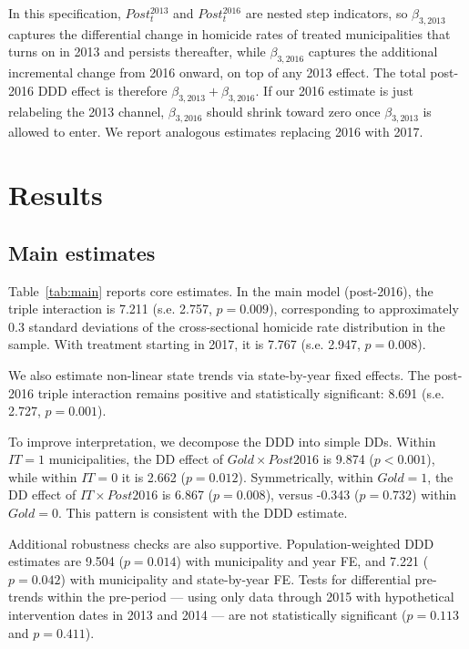 \documentclass[preprint,12pt]{elsarticle}
\renewcommand{\arraystretch}{1.2}
\begin{document}
In this specification, \(Post^{2013}_t\) and \(Post^{2016}_t\) are nested step indicators, so \(\beta_{3,2013}\) captures the differential change in homicide rates of treated municipalities that turns on in 2013 and persists thereafter, while \(\beta_{3,2016}\) captures the additional incremental change from 2016 onward, on top of any 2013 effect. The total post-2016 DDD effect is therefore \(\beta_{3,2013}+\beta_{3,2016}\). If our 2016 estimate is just relabeling the 2013 channel, $\beta_{3,2016}$ should shrink toward zero once $\beta_{3,2013}$ is allowed to enter. We report analogous estimates replacing 2016 with 2017.

\section{Results}
\subsection{Main estimates}
Table~\ref{tab:main} reports core estimates. In the main model (post-2016), the triple interaction is 7.211 (s.e. 2.757, \(p=0.009\)), corresponding to approximately 0.3 standard deviations of the cross-sectional homicide rate distribution in the sample. With treatment starting in 2017, it is 7.767 (s.e. 2.947, \(p=0.008\)).

We also estimate non-linear state trends via state-by-year fixed effects. The post-2016 triple interaction remains positive and statistically significant: 8.691 (s.e. 2.727, \(p=0.001\)).

\begin{table}[H]
\caption{Main DDD Estimates in Amazônia $+$ Cerrado Municipalities (2010$-$2022)}
\label{tab:main}
\centering
\setlength{\tabcolsep}{3.5pt}
\renewcommand{\arraystretch}{1.2}
\resizebox{\textwidth}{!}{}
\end{table}

To improve interpretation, we decompose the DDD into simple DDs. Within \(IT=1\) municipalities, the DD effect of \(Gold\times Post2016\) is 9.874 (\(p<0.001\)), while within \(IT=0\) it is 2.662 (\(p=0.012\)). Symmetrically, within \(Gold=1\), the DD effect of \(IT\times Post2016\) is 6.867 (\(p=0.008\)), versus -0.343 (\(p=0.732\)) within \(Gold=0\). This pattern is consistent with the DDD estimate.

Additional robustness checks are also supportive. Population-weighted DDD estimates are 9.504 (\(p=0.014\)) with municipality and year FE, and 7.221 (\(p=0.042\)) with municipality and state-by-year FE. Tests for differential pre-trends within the pre-period --- using only data through 2015 with hypothetical intervention dates in 2013 and 2014 --- are not statistically significant (\(p=0.113\) and \(p=0.411\)).
\end{document}
